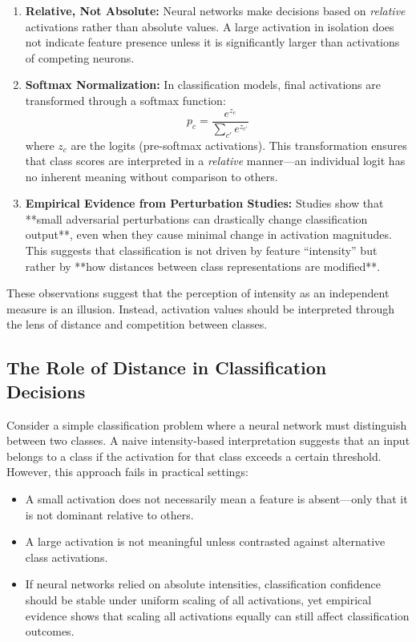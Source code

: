 \begin{enumerate}
    \item \textbf{Relative, Not Absolute:} Neural networks make decisions based on \textit{relative} activations rather than absolute values. A large activation in isolation does not indicate feature presence unless it is significantly larger than activations of competing neurons.
    \item \textbf{Softmax Normalization:} In classification models, final activations are transformed through a softmax function:
    \[
    p_c = \frac{e^{z_c}}{\sum_{c'} e^{z_{c'}}}
    \]
    where \( z_c \) are the logits (pre-softmax activations). This transformation ensures that class scores are interpreted in a \textit{relative} manner—an individual logit has no inherent meaning without comparison to others.
    \item \textbf{Empirical Evidence from Perturbation Studies:} Studies show that **small adversarial perturbations can drastically change classification output**, even when they cause minimal change in activation magnitudes. This suggests that classification is not driven by feature “intensity” but rather by **how distances between class representations are modified**.
\end{enumerate}

These observations suggest that the perception of intensity as an independent measure is an illusion. Instead, activation values should be interpreted through the lens of distance and competition between classes.

\subsection{The Role of Distance in Classification Decisions}

Consider a simple classification problem where a neural network must distinguish between two classes. A naive intensity-based interpretation suggests that an input belongs to a class if the activation for that class exceeds a certain threshold. However, this approach fails in practical settings:

\begin{itemize}
    \item A small activation does not necessarily mean a feature is absent—only that it is not dominant relative to others.
    \item A large activation is not meaningful unless contrasted against alternative class activations.
    \item If neural networks relied on absolute intensities, classification confidence should be stable under uniform scaling of all activations, yet empirical evidence shows that scaling all activations equally can still affect classification outcomes.
\end{itemize}

